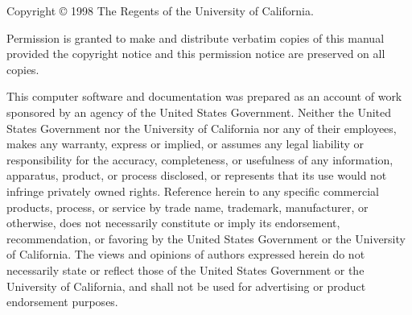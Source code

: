 \documentclass[11pt]{book}
\begin{document}

\begin{TitlePage}

\SubTitle{\today}
\vfill
\begin{center}
\end{center}
\vfill
{}

\end{TitlePage}


\begin{CopyrightPage}

\noindent
Copyright \copyright{} 1998 The Regents of the University of California.

\vspace{1em}\noindent
Permission is granted to make and distribute verbatim copies of this
manual provided the copyright notice and this permission notice are
preserved on all copies.

\vspace{1em}

This computer software and documentation was prepared as an account of
work sponsored by an agency of the United  States Government.  Neither
the United States Government nor the  University of California nor any
of their employees, makes any warranty, express or implied, or assumes
any legal liability  or responsibility for the accuracy, completeness,
or   usefulness of any   information,  apparatus, product, or  process
disclosed,   or represents that  its  use would not infringe privately
owned rights.  Reference  herein to any specific  commercial products,
process,   or service by   trade  name,  trademark,  manufacturer,  or
otherwise, does not  necessarily constitute or imply its  endorsement,
recommendation, or  favoring  by the  United  States Government or the
University of California.  The views and opinions of authors expressed
herein do not necessarily state or reflect those  of the United States
Government or the University of California, and shall  not be used for
advertising or product endorsement purposes.

\end{CopyrightPage}


\tableofcontents
\cleardoublepage
{}







% 



%


\printindex
\end{document}

